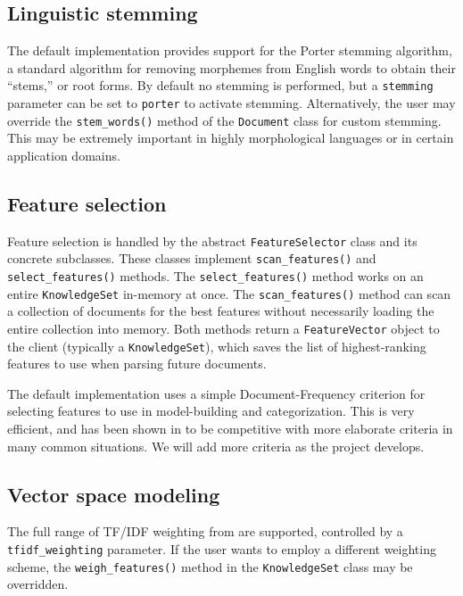 \documentclass[twocolumn]{article}
\newcommand{\method}[1]{\texttt{#1()}}
\newcommand{\class}[1]{\texttt{#1}}
\newcommand{\param}[1]{\texttt{#1}}
\begin{document}
\subsection*{Linguistic stemming}
The default implementation provides support for the Porter stemming
algorithm, a standard algorithm for removing morphemes from English
words to obtain their ``stems,'' or root forms.  By default no
stemming is performed, but a \param{stemming} parameter can be set to
\texttt{porter} to activate stemming.  Alternatively, the user may
override the \method{stem\_words} method of the \class{Document}
class for custom stemming.  This may be extremely important in highly
morphological languages or in certain application domains.

\subsection*{Feature selection}
Feature selection is handled by the abstract \class{FeatureSelector}
class and its concrete subclasses.  These classes implement
\method{scan\_features} and \method{select\_features} methods.  The
\method{select\_features} method works on an entire
\class{KnowledgeSet} in-memory at once.  The \method{scan\_features}
method can scan a collection of documents for the best features
without necessarily loading the entire collection into memory.  Both
methods return a \class{FeatureVector} object to the client (typically
a \class{KnowledgeSet}), which saves the list of highest-ranking
features to use when parsing future documents.

The default implementation uses a simple Document-Frequency criterion
for selecting features to use in model-building and categorization.
This is very efficient, and has been shown in \cite{yang:97} to be
competitive with more elaborate criteria in many common situations.
We will add more criteria as the project develops.

\subsection*{Vector space modeling}
The full range of TF/IDF weighting from \cite{salton:88} are
supported, controlled by a \param{tfidf\_weighting} parameter.  If
the user wants to employ a different weighting scheme, the
\method{weigh\_features} method in the \class{KnowledgeSet} class
may be overridden.
\end{document}
